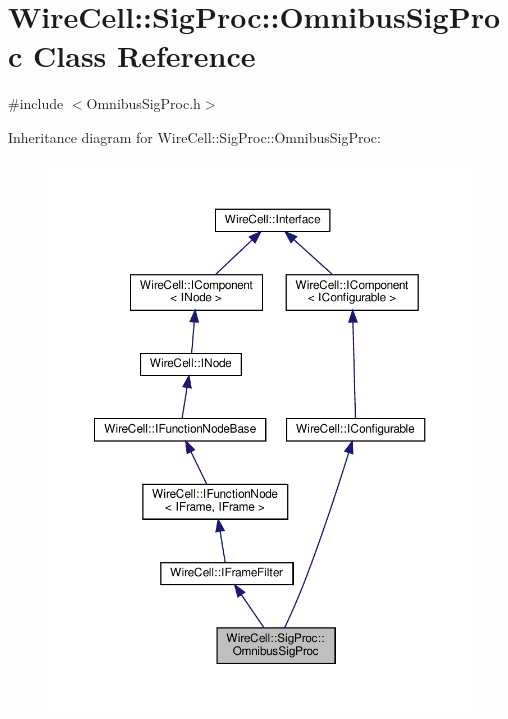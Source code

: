 \hypertarget{class_wire_cell_1_1_sig_proc_1_1_omnibus_sig_proc}{}\section{Wire\+Cell\+:\+:Sig\+Proc\+:\+:Omnibus\+Sig\+Proc Class Reference}
\label{class_wire_cell_1_1_sig_proc_1_1_omnibus_sig_proc}


{\ttfamily \#include $<$Omnibus\+Sig\+Proc.\+h$>$}



Inheritance diagram for Wire\+Cell\+:\+:Sig\+Proc\+:\+:Omnibus\+Sig\+Proc\+:
\nopagebreak
\begin{figure}[H]
\begin{center}
\leavevmode
\includegraphics[width=350pt]{class_wire_cell_1_1_sig_proc_1_1_omnibus_sig_proc__inherit__graph}
\end{center}
\end{figure}


